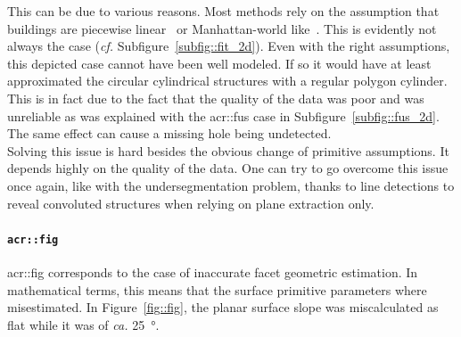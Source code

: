                 This can be due to various reasons.
                Most methods rely on the assumption that buildings are piecewise linear~\parencite{nan2017polyfit} or Manhattan-world like~\parencite{li2016boxfitting}.
                This is evidently not always the case (\textit{cf.} Subfigure~\ref{subfig::fit_2d}).
                Even with the right assumptions, this depicted case cannot have been well modeled.
                If so it would have at least approximated the circular cylindrical structures with a regular polygon cylinder.
                This is in fact due to the fact that the quality of the data was poor and was unreliable as was explained with the \gls{acr::fus} case in Subfigure~\ref{subfig::fus_2d}.
                The same effect can cause a missing hole being undetected.\\

                Solving this issue is hard besides the obvious change of primitive assumptions.
                It depends highly on the quality of the data.
                One can try to go overcome this issue once again, like with the undersegmentation problem, thanks to line detections to reveal convoluted structures when relying on plane extraction only. 

            \paragraph{\texttt{\acrlong*{acr::fig}}}
                \gls{acr::fig} corresponds to the case of inaccurate facet geometric estimation.
                In mathematical terms, this means that the surface primitive parameters where misestimated.
                In Figure~\ref{fig::fig}, the planar surface slope was miscalculated as flat while it was of \textit{ca.} \SI{25}{\degree}.\\


